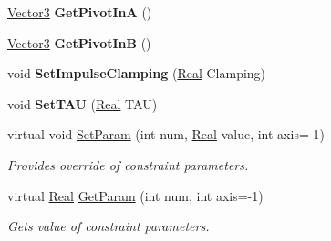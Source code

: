 \begin{DoxyCompactItemize}
\item 
\hypertarget{classphys_1_1Point2PointConstraint_a8cd4c87485faa5c1f4886f9be1bcabce}{
\hyperlink{classphys_1_1Vector3}{Vector3} {\bfseries GetPivotInA} ()}
\label{da/dfb/classphys_1_1Point2PointConstraint_a8cd4c87485faa5c1f4886f9be1bcabce}

\item 
\hypertarget{classphys_1_1Point2PointConstraint_a5efca869d0befa80d60caf71a2657db6}{
\hyperlink{classphys_1_1Vector3}{Vector3} {\bfseries GetPivotInB} ()}
\label{da/dfb/classphys_1_1Point2PointConstraint_a5efca869d0befa80d60caf71a2657db6}

\item 
\hypertarget{classphys_1_1Point2PointConstraint_a7d256d86e889681ab23967f7cc55390a}{
void {\bfseries SetImpulseClamping} (\hyperlink{namespacephys_af7eb897198d265b8e868f45240230d5f}{Real} Clamping)}
\label{da/dfb/classphys_1_1Point2PointConstraint_a7d256d86e889681ab23967f7cc55390a}

\item 
\hypertarget{classphys_1_1Point2PointConstraint_a953d0dedebbe55be82829a680935abad}{
void {\bfseries SetTAU} (\hyperlink{namespacephys_af7eb897198d265b8e868f45240230d5f}{Real} TAU)}
\label{da/dfb/classphys_1_1Point2PointConstraint_a953d0dedebbe55be82829a680935abad}

\item 
virtual void \hyperlink{classphys_1_1Point2PointConstraint_ad6f28464773121658e54e8bde2a14704}{SetParam} (int num, \hyperlink{namespacephys_af7eb897198d265b8e868f45240230d5f}{Real} value, int axis=-\/1)
\begin{DoxyCompactList}\small\item\em Provides override of constraint parameters. \item\end{DoxyCompactList}\item 
virtual \hyperlink{namespacephys_af7eb897198d265b8e868f45240230d5f}{Real} \hyperlink{classphys_1_1Point2PointConstraint_a0f58e2b57a463fe6fe44e7b3192fc3b7}{GetParam} (int num, int axis=-\/1)
\begin{DoxyCompactList}\small\item\em Gets value of constraint parameters. \item\end{DoxyCompactList}\end{DoxyCompactItemize}
